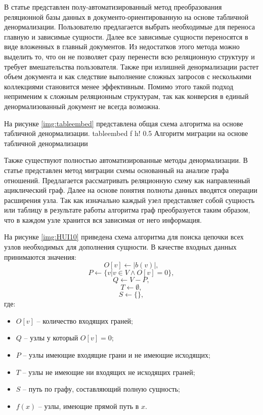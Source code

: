 В статье \cite{embedding} представлен полу-автоматизированный метод преобразования реляционной базы данных в документо-ориентированную на основе табличной денормализации.
Пользователю предлагается выбрать необходимые для переноса главную и зависимые сущности. 
Далее все зависимые сущности переносятся в виде вложенных в главный документов.
Из недостатков этого метода можно выделить то, что он не позволяет сразу перенести всю реляционную структуру и требует вмешательства пользователя.
Также при излишней денормализации растет объем документа и как следствие выполнение сложных запросов с несколькими коллекциями становится менее эффективным.
Помимо этого такой подход неприменим к сложным реляционным структурам, так как конверсия в единый денормализованный документ не всегда возможна.

\clearpage

На рисунке \ref{img:tableembed} представлена общая схема алгоритма на основе табличной денормализации.
    {tableembed} %
    {f} %
    {h!} %
    {0.5\textwidth} %
    {Алгоритм миграции на основе табличной денормализации} %

\clearpage

Также существуют полностью автоматизированные методы денормализации.
В статье \cite{graphmethod} представлен метод миграции схемы основанный на анализе графа отношений.
Предлагается рассматривать реляционную схему как направленный ациклический граф.
Далее на основе понятия полноты данных вводятся операции расширения узла.
Так как изначально каждый узел представляет собой сущность или таблицу в результате работы алгоритма граф преобразуется таким образом, что в каждом узле хранится вся зависимая от него информация.

На рисунке \ref{img:HUI10} приведена схема алгоритма для поиска цепочки всех узлов необходимых для дополнения сущности.
В качестве входных данных принимаются значения:
$$O[v] \leftarrow |b(v)|,$$
$$P \leftarrow  \{v | v \in V \wedge O[v] = 0\},$$
$$Q \leftarrow V - P,$$
$$T \leftarrow \emptyset,$$
$$ S \leftarrow \{\},$$
где:
\begin{itemize}[label=---]
    \item $O[v]$ -- количество входящих граней;
    \item $Q$ -- узлы у который $O[v] = 0$;
    \item $P$ -- узлы имеющие входящие грани и не имеющие исходящих;
    \item $T$ -- узлы не имеющие ни входящих не исходящих граней;
    \item $S$ -- путь по графу, составляющий полную сущность;
    \item $f(x)$ -- узлы, имеющие прямой путь в $x$.
\end{itemize}

